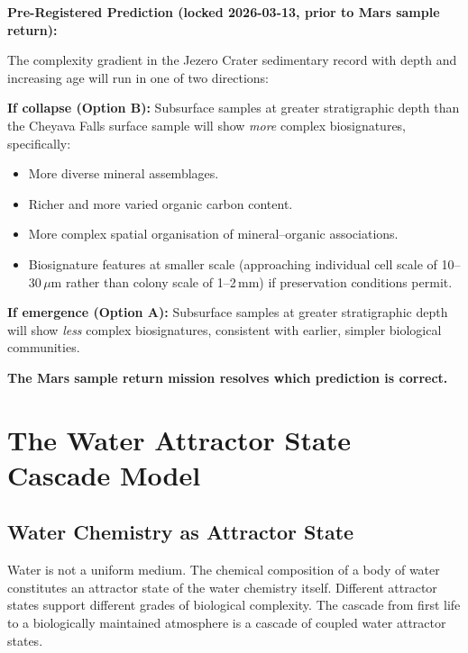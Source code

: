 \documentclass[11pt, a4paper]{article}
\begin{document}
\begin{mdframed}[
  linecolor=rulecolor,
  linewidth=0.8pt,
  innertopmargin=0.6em,
  innerbottommargin=0.6em,
  innerleftmargin=1em,
  innerrightmargin=1em
]
\textbf{Pre-Registered Prediction (locked 2026-03-13,
prior to Mars sample return):}

\medskip
The complexity gradient in the Jezero Crater
sedimentary record with depth and increasing age
will run in one of two directions:

\medskip
\textbf{If collapse (Option B):}
Subsurface samples at greater stratigraphic depth
than the Cheyava Falls surface sample will show
\textit{more} complex biosignatures, specifically:
\begin{itemize}[leftmargin=*]
\item More diverse mineral assemblages.
\item Richer and more varied organic carbon content.
\item More complex spatial organisation of
  mineral--organic associations.
\item Biosignature features at smaller scale
  (approaching individual cell scale of 10--30\,$\mu$m
  rather than colony scale of 1--2\,mm)
  if preservation conditions permit.
\end{itemize}

\textbf{If emergence (Option A):}
Subsurface samples at greater stratigraphic depth
will show \textit{less} complex biosignatures,
consistent with earlier, simpler biological
communities.

\medskip
\textbf{The Mars sample return mission resolves
which prediction is correct.}
\end{mdframed}

\section{The Water Attractor State Cascade Model}

\subsection{Water Chemistry as Attractor State}

Water is not a uniform medium.
The chemical composition of a body of water
constitutes an attractor state of the water
chemistry itself.
Different attractor states support different
grades of biological complexity.
The cascade from first life to a biologically
maintained atmosphere is a cascade of coupled
water attractor states.
\end{document}
